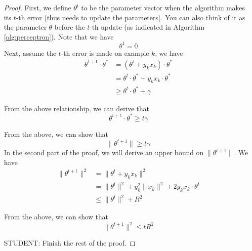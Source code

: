 \documentclass[12pt]{article}
\begin{document}
\begin{proof}
First, we define $\theta^t$ to be the parameter vector  when the algorithm makes its $t$-th error (thus needs to update the parameters). You can also think of it as the parameter $\theta$ before the $t$-th update (as indicated in Algorithm \ref{alg:perceptron}). Note that we have 
\begin{equation}
    \theta^1 =0
    \label{equ:1}
\end{equation}
Next, assume the $t$-th error is made on example $k$, we have
\begin{align}
    \theta^{t+1}\cdot \theta^*&=(\theta^{t}+y_kx_k)\cdot \theta^*\label{equ:2}\\
    &=\theta^{t}\cdot \theta^*+y_kx_k\cdot \theta^*\\
    &\geq \theta^{t}\cdot \theta^*+\gamma \label{equ:3}
\end{align}

From the above relationship,  we can derive that
\begin{equation}
    \theta^{t+1}\cdot \theta^*\geq t\gamma
    \label{equ:4}
\end{equation}

From the above, we can show that
\begin{equation}
    \|\theta^{t+1}\|\geq t\gamma\label{equ:cauchy}
\end{equation}
In the second part of the proof, we will derive an upper bound on $\|\theta^{t+1}\|$. We have
\begin{align}
    \|\theta^{t+1}\|^2&=\|\theta^{t}+y_kx_k\|^2\label{equ:5}\\
    &= \|\theta^{t}\|^2+y_k^2\|x_k\|^2+2y_kx_k\cdot \theta^t\\
    &\leq \|\theta^{t}\|^2+R^2\label{equ:6}
\end{align}

From the above, we can show that 
\begin{equation}
    \|\theta^{t+1}\|^2\leq tR^2\label{equ:7}
\end{equation}

STUDENT: Finish the rest of the proof.
\end{proof}
\end{document}

